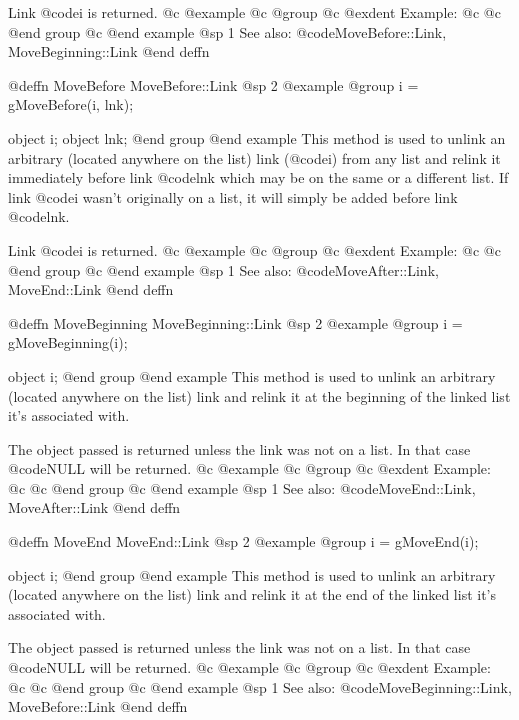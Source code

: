 Link @code{i} is returned.
@c @example
@c @group
@c @exdent Example:
@c 
@c @end group
@c @end example
@sp 1
See also:  @code{MoveBefore::Link, MoveBeginning::Link}
@end deffn







@deffn {MoveBefore} MoveBefore::Link
@sp 2
@example
@group
i = gMoveBefore(i, lnk);

object  i;
object  lnk;
@end group
@end example
This method is used to unlink an arbitrary (located anywhere on the
list) link (@code{i}) from any list and relink it immediately before link
@code{lnk} which may be on the same or a different list.  If link
@code{i} wasn't originally on a list, it will simply be added before
link @code{lnk}.

Link @code{i} is returned.
@c @example
@c @group
@c @exdent Example:
@c 
@c @end group
@c @end example
@sp 1
See also:  @code{MoveAfter::Link, MoveEnd::Link}
@end deffn













@deffn {MoveBeginning} MoveBeginning::Link
@sp 2
@example
@group
i = gMoveBeginning(i);

object  i;
@end group
@end example
This method is used to unlink an arbitrary (located anywhere on the
list) link and relink it at the beginning of the linked list it's
associated with.  

The object passed is returned unless the link was not on a list.  In
that case @code{NULL} will be returned.
@c @example
@c @group
@c @exdent Example:
@c 
@c @end group
@c @end example
@sp 1
See also:  @code{MoveEnd::Link, MoveAfter::Link}
@end deffn












@deffn {MoveEnd} MoveEnd::Link
@sp 2
@example
@group
i = gMoveEnd(i);

object  i;
@end group
@end example
This method is used to unlink an arbitrary (located anywhere on the
list) link and relink it at the end of the linked list it's
associated with.  

The object passed is returned unless the link was not on a list.  In
that case @code{NULL} will be returned.
@c @example
@c @group
@c @exdent Example:
@c 
@c @end group
@c @end example
@sp 1
See also:  @code{MoveBeginning::Link, MoveBefore::Link}
@end deffn














